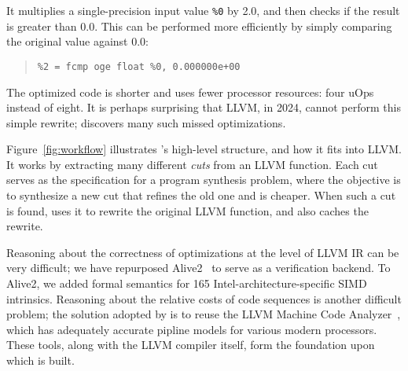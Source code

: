 It multiplies a single-precision input value \texttt{\%0} by 2.0, and
then checks if the result is greater than 0.0.
%
This can be performed more efficiently by simply comparing the
original value against 0.0:

{\begin{quote}
\begin{verbatim}
%2 = fcmp oge float %0, 0.000000e+00
\end{verbatim}
\end{quote}}

The optimized code is shorter and uses fewer processor resources: four
uOps instead of eight.
%
It is perhaps surprising that LLVM, in 2024, cannot perform this
simple rewrite; \minotaur{} discovers many such missed optimizations.



Figure~\ref{fig:workflow} illustrates \minotaur's high-level structure,
and how it fits into LLVM\@.
%
It works by extracting many different \textit{cuts} from an LLVM function.
%
Each cut serves as the specification for a program synthesis
problem, where the objective is to synthesize a new cut that refines
the old one and is cheaper.
%
When such a cut is found, \minotaur{} uses it to rewrite the original
LLVM function, and also caches the rewrite.


Reasoning about the correctness of optimizations at the level of LLVM
IR can be very difficult; we have repurposed Alive2~\cite{alive2} to
serve as a verification backend.
%
To Alive2, we added formal semantics for 165
Intel-architecture-specific SIMD intrinsics.
%
Reasoning about the relative costs of code sequences is another
difficult problem; the solution adopted by \minotaur{} is to reuse the
LLVM Machine Code Analyzer~\cite{llvmmca}, which has adequately
accurate pipline models for various modern processors.
%
These tools, along with the LLVM compiler itself, form the
foundation upon which \minotaur{} is built.


